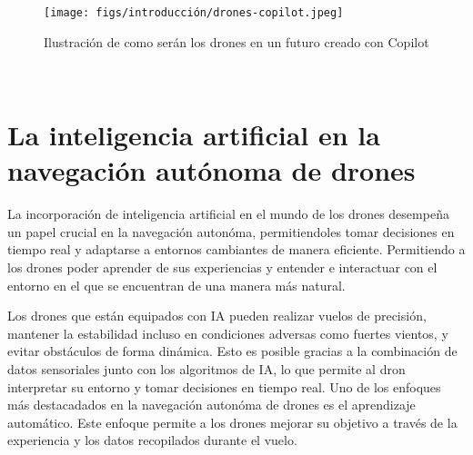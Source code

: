\begin{figure} [H]
  \begin{center}
    \texttt{[image: figs/introducción/drones-copilot.jpeg]}
  \end{center}
  \caption{Ilustración de como serán los drones en un futuro creado con Copilot}
  \label{fig:Copilot}
\end{figure}\

\newpage
\section{La inteligencia artificial en la navegación autónoma de drones}
\label{sec:IA}

La incorporación de inteligencia artificial en el mundo de los drones desempeña un papel crucial en la navegación autonóma, permitiendoles tomar decisiones en tiempo real y adaptarse 
a entornos cambiantes de manera eficiente. Permitiendo a los drones poder aprender de sus experiencias y entender e interactuar con el entorno en el que se encuentran de una manera más
natural. \newline

Los drones que están equipados con IA pueden realizar vuelos de precisión, mantener la estabilidad incluso en condiciones adversas como fuertes vientos, y evitar obstáculos 
de forma dinámica. Esto es posible gracias a la combinación de datos sensoriales junto con los algoritmos de IA, lo que permite 
al dron interpretar su entorno y tomar decisiones en tiempo real.\newline 
Uno de los enfoques más destacadados en la navegación autonóma de drones es el aprendizaje automático. Este enfoque permite a los drones mejorar su objetivo a través de la experiencia 
y los datos recopilados durante el vuelo. \newline

